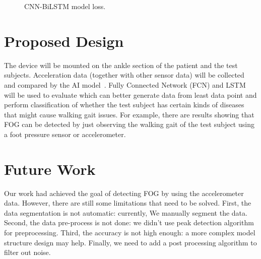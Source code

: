 \documentclass[10pt,twocolumn,letterpaper]{article}
\begin{document}
\begin{figure}[t]
    \centering
    \caption{CNN-BiLSTM model loss.}
    \label{fig:f20}
\end{figure}

\section{Proposed Design}
\label{sec:design}

    The device will be mounted on the ankle section of the patient and the test subjects. Acceleration data (together with other sensor data) will be collected and compared by the AI model~\cite{10.1007/978-3-319-59147-6_30}. Fully Connected Network (FCN) and LSTM will be used to evaluate which can better generate data from least data point and perform classification of whether the test subject has certain kinds of diseases that might cause walking gait issues. For example, there are results showing that FOG can be detected by just observing the walking gait of the test subject using a foot pressure sensor or accelerometer.

\section{Future Work}
\label{sec:future_work}

    Our work had achieved the goal of detecting FOG by using the accelerometer data. However, there are still some limitations that need to be solved. First, the data segmentation is not automatic: currently, We manually segment the data. Second, the data pre-process is not done: we didn't use peak detection algorithm for preprocessing. Third, the accuracy is not high enough: a more complex model structure design may help. Finally, we need to add a post processing algorithm to filter out noise.
    
\end{document}
